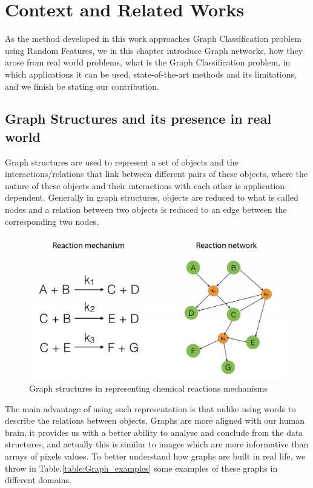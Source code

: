 \chapter{Context and Related Works}
As the method developed in this work approaches Graph Classification problem using Random Features, we in this chapter introduce Graph networks, how they arose from real world problems, what is the Graph Classification problem, in which applications it can be used, state-of-the-art methods and its limitations, and we finish be stating our contribution. 
\section{Graph Structures and its presence in real world}


Graph structures are used to represent a set of objects and the interactions/relations that link between different pairs of these objects, where the nature of these objects and their interactions with each other is application-dependent. Generally in graph structures, objects are reduced to what is called nodes and a relation between two objects is reduced to an edge between the corresponding two nodes.
\begin{figure}[H]
\centering
\includegraphics[scale=0.2]{LatexDiss/Dissertation/figs/Graph_example.png}
\caption[Graph example to represent Chemical Reactions]{Graph structures in representing chemical reactions mechanisms}
\label{fig:Graph_Example}
\end{figure}
The main advantage of using such representation is that unlike using words to describe the relations between objects, Graphs are more aligned with our human brain, it provides us with a better ability to analyse and conclude from the data structures, and actually this is similar to images which are more informative than arrays of pixels values. 
To better understand how graphs are built in real life, we throw in Table.\ref{table:Graph_examples} some examples of these graphs in different domains.

